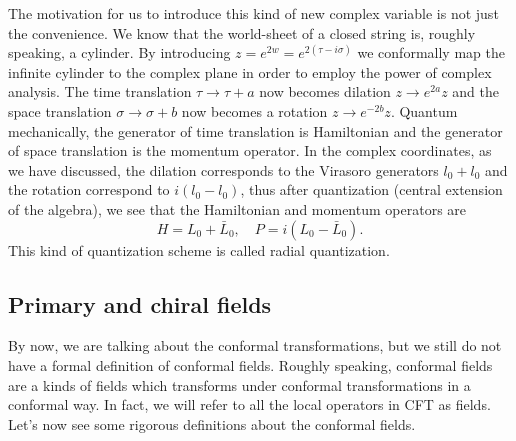 \documentclass[graybox,envcountchap,sectrefs]{svmono}
\begin{document}
The motivation for us to introduce this kind of new complex variable is not just the convenience. 
We know that the world-sheet of a closed string is, roughly speaking, a cylinder. 
By introducing $z=e^{2w}=e^{2(\tau-i\sigma)}$ we conformally map the infinite cylinder to the complex plane in order to employ the power of complex analysis. 
The time translation $\tau\to \tau +a$ now becomes dilation $z\to e^{2a}z$ and the space translation $\sigma\to \sigma +b$ now becomes a rotation $z\to e^{-2b}z$.
Quantum mechanically, the generator of time translation is Hamiltonian and the generator of space translation is the momentum operator.
In the complex coordinates, as we have discussed, the dilation corresponds to the Virasoro generators $l_0+l_0$ and the rotation correspond to $i(l_0-l_0)$, thus after quantization (central extension of the algebra), we see that the Hamiltonian and momentum operators are
\begin{equation}
H=L_0+\bar{L}_0, \quad P=i(L_0-\bar{L}_0).
\end{equation}
This kind of quantization scheme is called radial quantization.

\subsection{Primary and chiral fields}
By now, we are talking about the conformal transformations, but we still do not have a formal definition of conformal fields. 
Roughly speaking, conformal fields are a kinds of fields which transforms under conformal transformations in a conformal way. In fact, we will refer to all the local operators in CFT as fields. Let's now see some rigorous definitions about the conformal fields.
\end{document}
